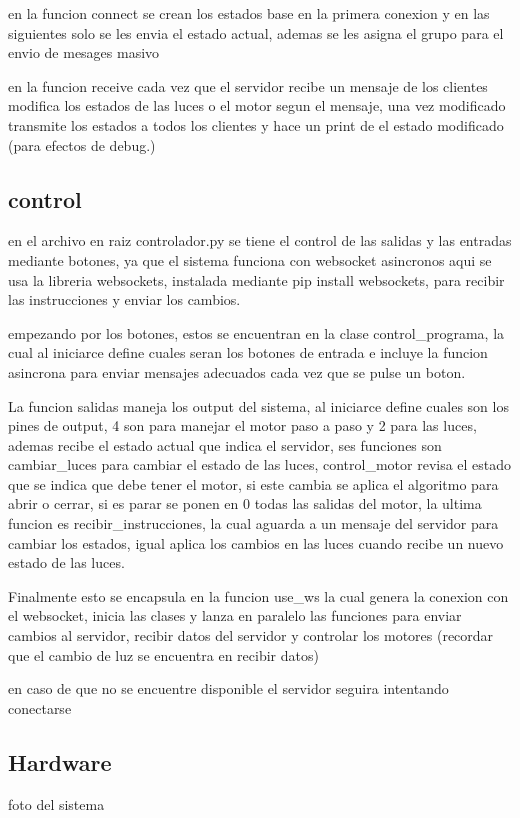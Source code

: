 en la funcion connect se crean los estados base en la primera conexion y en las siguientes solo se les envia el estado actual, ademas se les asigna el grupo para el envio de mesages masivo

en la funcion receive cada vez que el servidor recibe un mensaje de los clientes modifica los estados de las luces o el motor segun el mensaje, una vez modificado transmite los estados a todos los clientes y hace un print de el estado modificado (para efectos de debug.)


\subsection{control}
en el archivo en raiz controlador.py se tiene el control de las salidas y las entradas mediante botones, ya que el sistema funciona con websocket asincronos aqui se usa la libreria websockets, instalada mediante pip install websockets, para recibir las instrucciones y enviar los cambios.

empezando por los botones, estos se encuentran en la clase control\_programa, la cual al iniciarce define cuales seran los botones de entrada e incluye la funcion asincrona para enviar mensajes adecuados cada vez que se pulse un boton.


La funcion salidas maneja los output del sistema, al iniciarce define cuales son los pines de output, 4 son para manejar el motor paso a paso y 2 para las luces, ademas recibe el estado actual que indica el servidor, ses funciones son cambiar\_luces para cambiar el estado de las luces, control\_motor revisa el estado que se indica que debe tener el motor, si este cambia se aplica el algoritmo para abrir o cerrar, si es parar se ponen en 0 todas las salidas del motor, la ultima funcion es recibir\_instrucciones, la cual aguarda a un mensaje del servidor para cambiar los estados, igual aplica los cambios en las luces cuando recibe un nuevo estado de las luces.

Finalmente esto se encapsula en la funcion use\_ws la cual genera la conexion con el websocket, inicia las clases y lanza en paralelo las funciones para enviar cambios al servidor, recibir datos del servidor y controlar los motores (recordar que el cambio de luz se encuentra en recibir datos)

en caso de que no se encuentre disponible el servidor seguira intentando conectarse

\subsection{Hardware}

foto del sistema